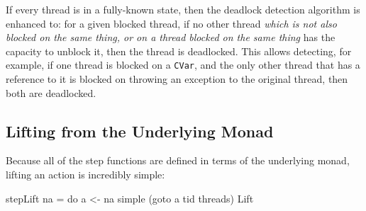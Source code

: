 If every thread is in a fully-known state, then the deadlock detection
algorithm is enhanced to: for a given blocked thread, if no other
thread \emph{which is not also blocked on the same thing, or on a
  thread blocked on the same thing} has the capacity to unblock it,
then the thread is deadlocked. This allows detecting, for example, if
one thread is blocked on a \verb|CVar|, and the only other thread that
has a reference to it is blocked on throwing an exception to the
original thread, then both are deadlocked.

\subsection{Lifting from the Underlying Monad}
\label{sec:execution-stepwise-lift}

Because all of the step functions are defined in terms of the
underlying monad, lifting an action is incredibly simple:

\begin{haskellcode}
stepLift na = do
  a <- na
  simple (goto a tid threads) Lift
\end{haskellcode}
